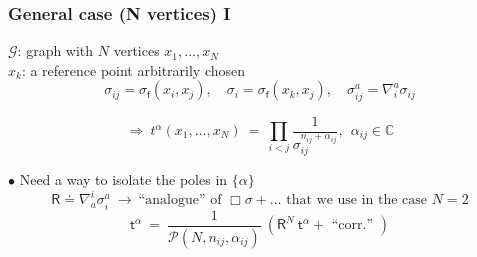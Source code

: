\documentclass[9pt]{beamer}
\newcommand{\Gcal}{\mathcal{G}}
\newcommand{\Pcal}{\mathcal{P}}
\newcommand{\Cbb}{\mathbb{C}}
\newcommand{\Rsf}{\mathsf{R}}
\newcommand{\fsf}{\mathsf{f}}
\newcommand{\tsf}{\mathsf{t}}
\begin{document}

\begin{frame}
 
\frametitle{General case (N vertices) I}

\vfill

\begin{figure}
\end{figure}

$\Gcal$: graph with $N$ vertices $x_1, \dots, x_N$ \\
$x_k$: a reference point arbitrarily chosen
\begin{equation*}
\sigma_{ij} = \sigma_\fsf(x_i,x_j), \quad \sigma_{i} = \sigma_\fsf(x_k,x_j), \quad \sigma^a_{ij} = \nabla^a_i \sigma_{ij}
\end{equation*}

\vfill

\begin{equation*}
\Rightarrow \ t^\alpha(x_1, \dots, x_N) \ = \ \prod_{i<j} \frac{1}{\sigma_{ij}^{n_{ij}+\alpha_{ij}}} , \ \ \alpha_{ij} \in \Cbb
\end{equation*}

$\bullet$ Need a way to isolate the poles in $\{\alpha\}$
\vspace*{-5pt}
\begin{equation*}
\Rsf \doteq \nabla_a^i \sigma_i^a \ \to \ \mbox{``analogue'' of $\Box \sigma + \dots$ that we use in the case $N=2$}
\end{equation*}
\vspace*{-10pt}
\begin{equation*}
\tsf^\alpha \ = \ \frac{1}{\Pcal(N,n_{ij},\alpha_{ij})} \ \left( \Rsf^N \ \tsf^\alpha + \mbox{ ``corr.'' }  \right) 
\end{equation*}

\vfill

\end{frame}

\end{document}
